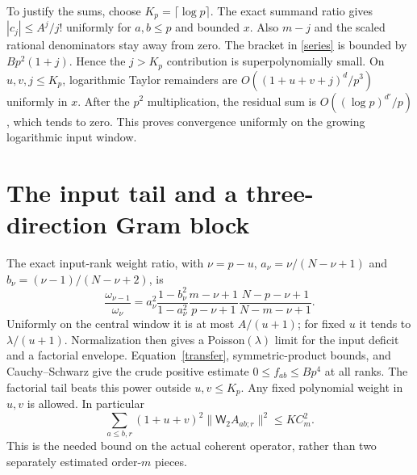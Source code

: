 \documentclass[11pt,a4paper]{article}
\newcommand{\W}{\mathsf W_2}
\begin{document}
To justify the sums, choose $K_p=\lceil\log p\rceil$.
The exact summand ratio gives $|c_j|\le A^j/j!$ uniformly for
$a,b\le p$ and bounded $x$. Also $m-j$ and the scaled rational
denominators stay away from zero. The bracket in \eqref{series}
is bounded by $Bp^2(1+j)$. Hence the $j>K_p$ contribution is
superpolynomially small. On $u,v,j\le K_p$, logarithmic Taylor
remainders are $O((1+u+v+j)^d/p^3)$ uniformly in $x$.
After the $p^2$ multiplication, the residual sum is
$O((\log p)^{d'}/p)$, which tends to zero. This proves convergence
uniformly on the growing logarithmic input window.

\newpage
\section{The input tail and a three-direction Gram block}
The exact input-rank weight ratio, with $\nu=p-u$,
$a_\nu=\nu/(N-\nu+1)$ and $b_\nu=(\nu-1)/(N-\nu+2)$, is
\begin{equation}
 \frac{\omega_{\nu-1}}{\omega_\nu}
 =a_\nu^2\frac{1-b_\nu^2}{1-a_\nu^2}
 \frac{m-\nu+1}{p-\nu+1}\frac{N-p-\nu+1}{N-m-\nu+1}.
\end{equation}
Uniformly on the central window it is at most $A/(u+1)$;
for fixed $u$ it tends to $\lambda/(u+1)$. Normalization then
gives a Poisson$(\lambda)$ limit for the input deficit and a
factorial envelope. Equation~\eqref{transfer}, symmetric-product
bounds, and Cauchy--Schwarz give the crude positive estimate
$0\le f_{ab}\le Bp^4$ at all ranks. The factorial tail beats
this power outside $u,v\le K_p$. Any fixed polynomial weight
in $u,v$ is allowed. In particular
\begin{equation}
 \sum_{a\le b,r}(1+u+v)^2\|\W A_{ab;r}\|^2\le KC_m^2.
 \label{input}
\end{equation}
This is the needed bound on the actual coherent operator, rather
than two separately estimated order-$m$ pieces.
\end{document}
